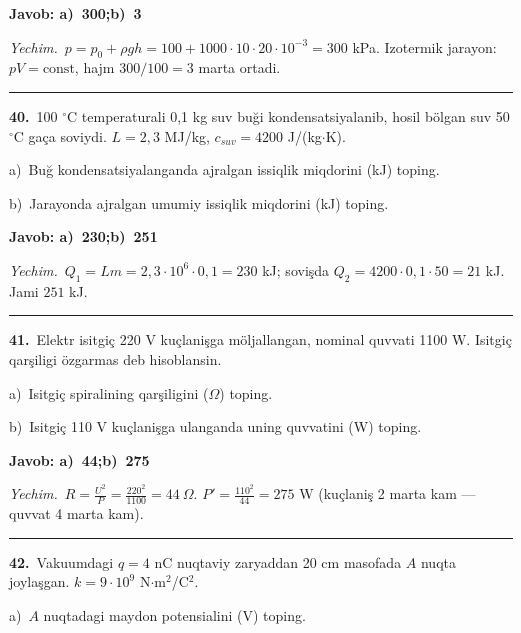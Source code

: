 \documentclass[11pt,a4paper]{article}
\begin{document}
\noindent\colorbox{gray!12}{\parbox{\dimexpr\linewidth-2\fboxsep}{\textbf{Javob: a)\ 300;\quad b)\ 3}}}\par\smallskip
\noindent\textit{Yechim.}\ $p=p_0+\rho gh=100+1000\cdot10\cdot20\cdot10^{-3}=300$ kPa. Izotermik jarayon: $pV=\text{const}$, hajm $300/100=3$ marta ortadi.\par\par\medskip\hrule\medskip
{}\noindent\textbf{40.}\ 100 $^\circ$C temperaturali 0,1 kg suv buği kondensatsiyalanib, hosil bölgan suv 50 $^\circ$C gaça soviydi. $L=2{,}3$ MJ/kg, $c_{suv}=4200$ J/(kg$\cdot$K).\par
\noindent\hspace*{4mm}a)\ Buğ kondensatsiyalanganda ajralgan issiqlik miqdorini (kJ) toping.\par
\noindent\hspace*{4mm}b)\ Jarayonda ajralgan umumiy issiqlik miqdorini (kJ) toping.\par
\noindent\colorbox{gray!12}{\parbox{\dimexpr\linewidth-2\fboxsep}{\textbf{Javob: a)\ 230;\quad b)\ 251}}}\par\smallskip
\noindent\textit{Yechim.}\ $Q_1=Lm=2{,}3\cdot10^6\cdot0{,}1=230$ kJ; sovişda $Q_2=4200\cdot0{,}1\cdot50=21$ kJ. Jami $251$ kJ.\par\par\medskip\hrule\medskip
{}\noindent\textbf{41.}\ Elektr isitgiç 220 V kuçlanişga möljallangan, nominal quvvati 1100 W. Isitgiç qarşiligi özgarmas deb hisoblansin.\par
\noindent\hspace*{4mm}a)\ Isitgiç spiralining qarşiligini ($\Omega$) toping.\par
\noindent\hspace*{4mm}b)\ Isitgiç 110 V kuçlanişga ulanganda uning quvvatini (W) toping.\par
\noindent\colorbox{gray!12}{\parbox{\dimexpr\linewidth-2\fboxsep}{\textbf{Javob: a)\ 44;\quad b)\ 275}}}\par\smallskip
\noindent\textit{Yechim.}\ $R=\frac{U^2}{P}=\frac{220^2}{1100}=44\ \Omega$. $P'=\frac{110^2}{44}=275$ W (kuçlaniş 2 marta kam — quvvat 4 marta kam).\par\par\medskip\hrule\medskip
{}\noindent\textbf{42.}\ Vakuumdagi $q=4$ nC nuqtaviy zaryaddan 20 cm masofada $A$ nuqta joylaşgan. $k=9\cdot10^9$ N$\cdot$m$^2$/C$^2$.\par
\noindent\hspace*{4mm}a)\ $A$ nuqtadagi maydon potensialini (V) toping.\par
\end{document}
